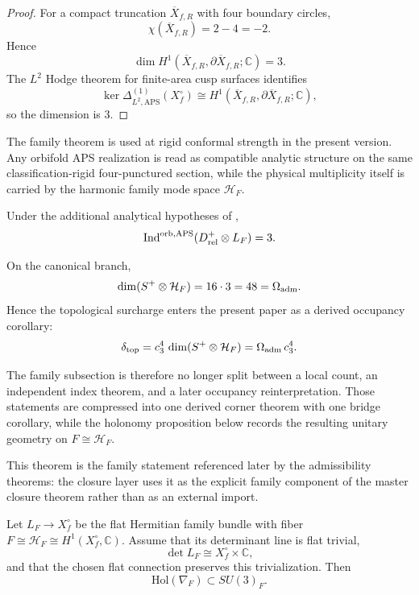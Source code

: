 \begin{proof}
For a compact truncation $\overline X_{f,R}$ with four boundary circles,
\[
\chi(\overline X_{f,R})=2-4=-2.
\]
Hence
\[
\dim H^1(\overline X_{f,R},\partial\overline X_{f,R};\mathbb C)=3.
\]
The $L^2$ Hodge theorem for finite-area cusp surfaces identifies
\[
\ker \Delta^{(1)}_{L^2,\mathrm{APS}}(X_f^\circ)
\cong
H^1(\overline X_{f,R},\partial\overline X_{f,R};\mathbb C),
\]
so the dimension is $3$.
\end{proof}

\begin{remark}
The family theorem is used at rigid conformal strength in the present version. Any orbifold APS
realization is read as compatible analytic structure on the same classification-rigid
four-punctured section, while the physical multiplicity itself is carried by the harmonic family
mode space $\mathcal H_F$.
\end{remark}

\begin{proposition}
\label{prop:orbifold-aps-compatibility}
Under the additional analytical hypotheses of ,
\[
\operatorname{Ind}^{\mathrm{orb,APS}}(D_{\mathrm{rel}}^+\otimes L_F)=3.
\]
\end{proposition}

\begin{corollary}
\label{cor:boundary-bulk-occupancy}
\label{cor:derived-occupancy-identity}
On the canonical branch,
\[
\dim(S^+\otimes \mathcal H_F)=16\cdot 3=48=\Omega_{\mathrm{adm}}.
\]
Hence the topological surcharge enters the present paper as a derived occupancy corollary:
\[
\delta_{\mathrm{top}}
=
c_3^4\,\dim(S^+\otimes \mathcal H_F)
=
\Omega_{\mathrm{adm}}\,c_3^4.
\]
\end{corollary}

The family subsection is therefore no longer split between a local count, an independent index
theorem, and a later occupancy reinterpretation. Those statements are compressed into one derived
corner theorem with one bridge corollary, while the holonomy proposition below records the
resulting unitary geometry on $F\cong \mathcal H_F$.

This theorem is the family statement referenced later by the admissibility theorems: the closure layer uses it as the explicit family component of the master closure theorem rather than as an external import.

\begin{proposition}
\label{prop:family-holonomy-su3}
Let $L_F\to X_f^\circ$ be the flat Hermitian family bundle with fiber
$F\cong \mathcal H_F\cong H^1(X_f^\circ,\mathbb C)$. Assume that its determinant line is flat trivial,
\[
\det L_F \cong X_f^\circ\times \mathbb C,
\]
and that the chosen flat connection preserves this trivialization. Then
\[
\mathrm{Hol}(\nabla_F)\subset SU(3)_F.
\]
\end{proposition}

